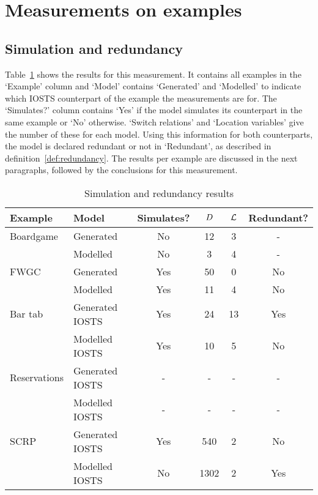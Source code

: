 \section{Measurements on examples}

\subsection{Simulation and redundancy}
Table~\ref{tab:simulation} shows the results for this measurement. It contains all examples in the `Example' column and `Model' contains `Generated' and `Modelled' to indicate which IOSTS counterpart of the example the measurements are for. The `Simulates?' column contains `Yes' if the model simulates its counterpart in the same example or `No' otherwise. `Switch relations' and `Location variables' give the number of these for each model. Using this information for both counterparts, the model is declared redundant or not in `Redundant', as described in definition~\ref{def:redundancy}. The results per example are discussed in the next paragraphs, followed by the conclusions for this measurement.

\begin{table}[ht]
\begin{center}
\begin{tabular}{|l|l|c|c|c|c|}
\hline
\textbf{Example} & \textbf{Model} & \textbf{Simulates?} & \textbf{$D$} & \textbf{$\mathcal{L}$} & \textbf{Redundant?} \\ \hline
Boardgame & Generated & No & 12 & 3 & - \\ \cline{2-6}
 & Modelled & No & 3 & 4 & - \\ \hline
FWGC & Generated & Yes & 50 & 0 & No \\ \cline{2-6}
 & Modelled & Yes & 11 & 4 & No \\ \hline
Bar tab & Generated IOSTS & Yes & 24 & 13 & Yes \\ \cline{2-6}
 & Modelled IOSTS & Yes & 10 & 5 & No \\ \hline
Reservations & Generated IOSTS & - & - & - & - \\ \cline{2-6}
 & Modelled IOSTS & - & - & - & - \\ \hline
SCRP & Generated IOSTS & Yes & 540 & 2 & No \\ \cline{2-6}
 & Modelled IOSTS & No & 1302 & 2 & Yes \\ \hline
\end{tabular}
\end{center}
\caption{Simulation and redundancy results}
\label{tab:simulation}
\end{table}

